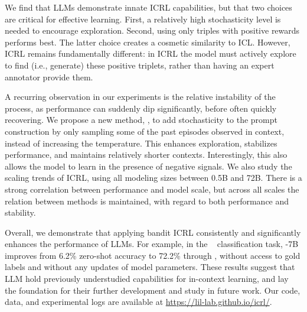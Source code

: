 We find that LLMs demonstrate innate ICRL capabilities, but that two choices are critical for effective learning. 
First, a relatively high stochasticity level is needed to encourage exploration. Second, using only triples with positive rewards performs best.%
The latter choice creates a cosmetic similarity to ICL. However, ICRL remains fundamentally different: in ICRL the model must actively explore to find (i.e., generate) these positive triplets, rather than having an expert annotator provide them. 





A recurring observation in our experiments is the relative instability of the process, as performance can suddenly dip significantly, before often quickly recovering. 
We propose a new method, \textit{\explorative}, to add stochasticity to the prompt construction by only sampling some of the past episodes observed in context, instead of increasing the temperature. 
This enhances exploration, stabilizes performance, and maintains relatively shorter contexts. 
Interestingly, this also allows the model to learn in the presence of negative signals.%
We also study the scaling trends of ICRL, using all  modeling sizes between 0.5B and 72B.
There is a strong correlation between performance and model scale, but across all scales the relation between methods is maintained, with regard to both performance and stability.

Overall, we demonstrate that applying bandit ICRL consistently and significantly enhances the performance of LLMs. 
For example, in the \banking~\citep{Casanueva2020} classification task, -7B improves from 6.2\% zero-shot accuracy to 72.2\% through \explorative, without access to gold labels and without any updates of model parameters. 
These results suggest that LLM hold previously understudied  capabilities for in-context learning, and lay the foundation for their further development and study in future work.
Our code, data, and experimental logs are available at \url{https://lil-lab.github.io/icrl/}. 

